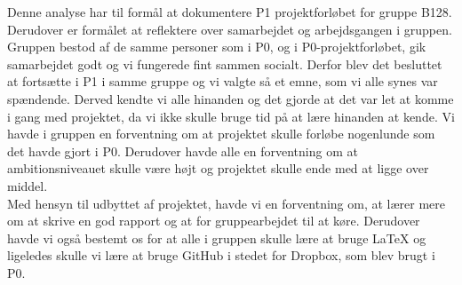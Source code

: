 Denne analyse har til formål at dokumentere P1 projektforløbet for gruppe B128. Derudover er formålet at reflektere over samarbejdet og arbejdsgangen i gruppen.
\\
Gruppen bestod af de samme personer som i P0, og i P0-projektforløbet, gik samarbejdet godt og vi fungerede fint sammen socialt. Derfor blev det besluttet at fortsætte i P1 i samme gruppe og vi valgte så et emne, som vi alle synes var spændende. Derved kendte vi alle hinanden og det gjorde at det var let at komme i gang med projektet, da vi ikke skulle bruge tid på at lære hinanden at kende. Vi havde i gruppen en forventning om at projektet skulle forløbe nogenlunde som det havde gjort i P0. Derudover havde alle en forventning om at ambitionsniveauet skulle være højt og projektet skulle ende med at ligge over middel. 
\\
Med hensyn til udbyttet af projektet, havde vi en forventning om, at lærer mere om at skrive en god rapport og at for gruppearbejdet til at køre. Derudover havde vi også bestemt os for at alle i gruppen skulle lære at bruge \LaTeX{} og ligeledes skulle vi lære at bruge GitHub i stedet for Dropbox, som blev brugt i P0.  
